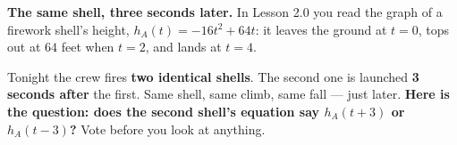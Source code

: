 \documentclass[10pt]{article}
\begin{document}
\vspace{0.10in}

\boxguard[12]
\begin{hookbox}
\small
\textbf{The same shell, three seconds later.} In Lesson 2.0 you read the graph of a firework
shell's height, $h_A(t)=-16t^2+64t$: it leaves the ground at $t=0$, tops out at $64$ feet when
$t=2$, and lands at $t=4$.

Tonight the crew fires \textbf{two identical shells}. The second one is launched \textbf{3 seconds
after} the first. Same shell, same climb, same fall --- just later. \textbf{Here is the question:
does the second shell's equation say $h_A(t+3)$ or $h_A(t-3)$?} Vote before you look at anything.

\\
\\
\end{hookbox}

\vspace{0.10in}
\end{document}
